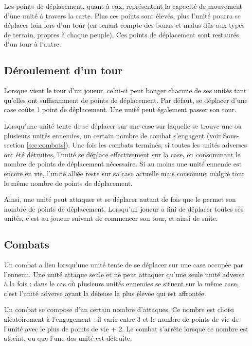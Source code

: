 	Les points de déplacement, quant à eux, représentent la capacité de mouvement d'une unité à travers la carte. Plus ces points sont élevés, plus l'unité pourra se déplacer loin lors d'un tour (en tenant compte des bonus et malus dûs aux types de terrain, propres à chaque peuple). Ces points de déplacement sont restaurés d'un tour à l'autre.
	
	\subsection{Déroulement d'un tour}
	Lorsque vient le tour d'un joueur, celui-ci peut bouger chacune de ses unités tant qu'elles ont suffisamment de points de déplacement. Par défaut, se déplacer d'une case coûte 1 point de déplacement. Une unité peut également passer son tour.
	
	Lorsqu'une unité tente de se déplacer sur une case sur laquelle se trouve une ou plusieurs unités ennemies, un certain nombre de combat s'engagent (voir Sous-section \ref{sec:combats}). Une fois les combats terminés, si toutes les unités adverses ont été détruites, l'unité se déplace effectivement sur la case, en consommant le nombre de points de déplacement nécessaire. Si au moins une unité ennemie est encore en vie, l'unité alliée reste sur sa case actuelle mais consomme malgré tout le même nombre de points de déplacement.
	
	Ainsi, une unité peut attaquer et se déplacer autant de fois que le permet son nombre de points de déplacement. Lorsqu'un joueur a fini de déplacer toutes ses unités, c'est au joueur suivant de commencer son tour, et ainsi de suite.

	\subsection{Combats}
	\label{subsec:combats}
	Un combat a lieu lorsqu'une unité tente de se déplacer sur une case occupée par l'ennemi. Une unité attaque seule et ne peut attaquer qu'une seule unité adverse à la fois : dans le cas où plusieurs unités ennemies se situent sur la même case, c'est l'unité adverse ayant la défense la plus élevée qui est affrontée.
	
	Un combat se compose d’un certain nombre d’attaques. Ce	nombre est choisi aléatoirement à l’engagement : il varie entre 3 et le nombre de points de vie de l’unité avec le plus de points de vie + 2. Le combat s’arrête lorsque ce nombre est atteint, ou que l'une des unité est détruite. 
	

